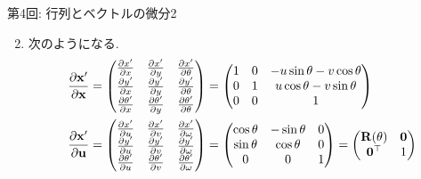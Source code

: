 \documentclass[dvipdfmx,notheorems,t]{beamer}
\begin{document}
\begin{frame}{第4回: 行列とベクトルの微分2}
\begin{enumerate}
  \setcounter{enumi}{1}
  \item 次のようになる.
  \begin{align*}
    \pdv{\vb{x}'}{\vb{x}} &= \mqty(\pdv{x'}{x} & \pdv{x'}{y} & \pdv{x'}{\theta} \\
      \pdv{y'}{x} & \pdv{y'}{y} & \pdv{y'}{\theta} \\
      \pdv{\theta'}{x} & \pdv{\theta'}{y} & \pdv{\theta'}{\theta})
      = \mqty(1 & 0 & -u \sin \theta - v \cos \theta \\
        0 & 1 & u \cos \theta - v \sin \theta \\ 0 & 0 & 1) \\
    \pdv{\vb{x}'}{\vb{u}} &= \mqty(\pdv{x'}{u} & \pdv{x'}{v} & \pdv{x'}{\omega} \\
      \pdv{y'}{u} & \pdv{y'}{v} & \pdv{y'}{\omega} \\
      \pdv{\theta'}{u} & \pdv{\theta'}{v} & \pdv{\theta'}{\omega})
      = \mqty(\cos \theta & -\sin \theta & 0 \\
        \sin \theta & \cos \theta & 0 \\ 0 & 0 & 1)
      = \mqty(\vb{R}(\theta) & \vb{0} \\ \vb{0}^\top & 1)
  \end{align*}
\end{enumerate}
\end{frame}
\end{document}
